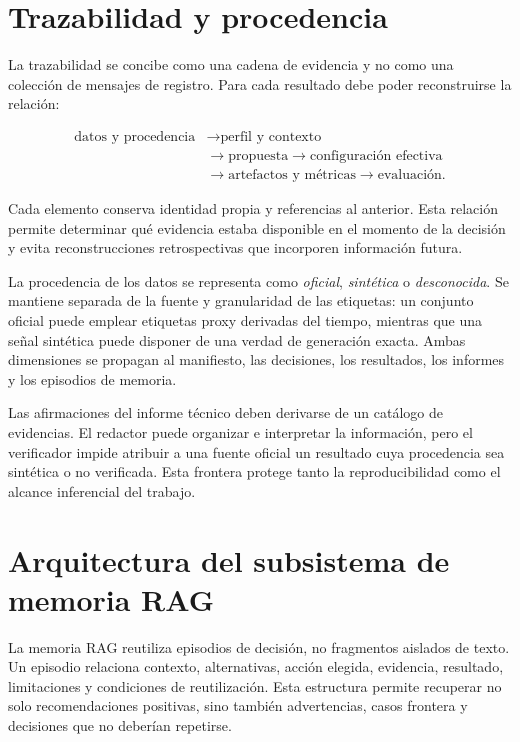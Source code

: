 \section{Trazabilidad y procedencia}

La trazabilidad se concibe como una cadena de evidencia y no como una colección
de mensajes de registro. Para cada resultado debe poder reconstruirse la
relación:

\[
\begin{aligned}
\text{datos y procedencia}
&\longrightarrow \text{perfil y contexto} \\
&\longrightarrow \text{propuesta}
\longrightarrow \text{configuración efectiva} \\
&\longrightarrow \text{artefactos y métricas}
\longrightarrow \text{evaluación}.
\end{aligned}
\]

Cada elemento conserva identidad propia y referencias al anterior. Esta
relación permite determinar qué evidencia estaba disponible en el momento de
la decisión y evita reconstrucciones retrospectivas que incorporen información
futura.

La procedencia de los datos se representa como \emph{oficial},
\emph{sintética} o \emph{desconocida}. Se mantiene separada de la fuente y
granularidad de las etiquetas: un conjunto oficial puede emplear etiquetas
proxy derivadas del tiempo, mientras que una señal sintética puede disponer de
una verdad de generación exacta. Ambas dimensiones se propagan al manifiesto,
las decisiones, los resultados, los informes y los episodios de memoria.

Las afirmaciones del informe técnico deben derivarse de un catálogo de
evidencias. El redactor puede organizar e interpretar la información, pero el
verificador impide atribuir a una fuente oficial un resultado cuya procedencia
sea sintética o no verificada. Esta frontera protege tanto la reproducibilidad
como el alcance inferencial del trabajo.

\section{Arquitectura del subsistema de memoria RAG}

La memoria RAG reutiliza episodios de decisión, no fragmentos aislados de texto.
Un episodio relaciona contexto, alternativas, acción elegida, evidencia,
resultado, limitaciones y condiciones de reutilización. Esta estructura permite
recuperar no solo recomendaciones positivas, sino también advertencias, casos
frontera y decisiones que no deberían repetirse.

